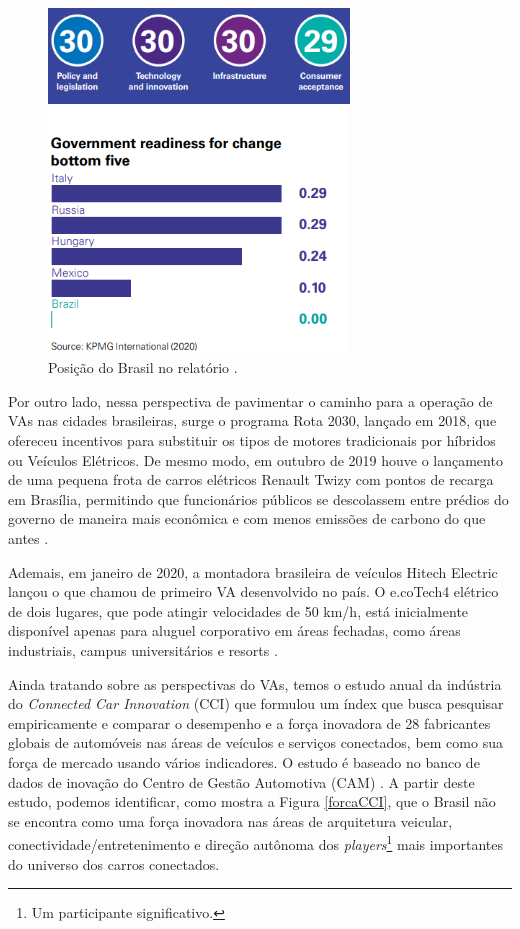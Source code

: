 \begin{figure}[H]
\centering
\includegraphics[width=8cm]{Figures/rank30.png}
\caption{Posição do Brasil no relatório \cite{KPMG}.}
\label{rank30}
\end{figure}

Por outro lado, nessa perspectiva de pavimentar o caminho para a operação de VAs nas cidades brasileiras, surge o programa Rota 2030, lançado em 2018, que ofereceu incentivos para substituir os tipos de motores tradicionais por híbridos ou Veículos Elétricos. De mesmo modo, em outubro de 2019 houve o lançamento de uma pequena frota de carros elétricos Renault Twizy com pontos de recarga em Brasília, permitindo que funcionários públicos se descolassem entre prédios do governo de maneira mais econômica e com menos emissões de carbono do que antes \cite{KPMG}.

Ademais, em janeiro de 2020, a montadora brasileira de veículos Hitech Electric lançou o que chamou de primeiro VA desenvolvido no país. O e.coTech4 elétrico de dois lugares, que pode atingir velocidades de 50 km/h, está inicialmente disponível apenas para aluguel corporativo em áreas fechadas, como áreas industriais, campus universitários e resorts \cite{KPMG}.


Ainda tratando sobre as perspectivas do VAs, temos o estudo anual da indústria do \textit{Connected Car Innovation} (CCI) que formulou um índex que busca pesquisar empiricamente e comparar o desempenho e a força inovadora de 28 fabricantes globais de automóveis nas áreas de veículos e serviços conectados, bem como sua força de mercado usando vários indicadores. O estudo é baseado no banco de dados de inovação do Centro de Gestão Automotiva (CAM) \cite{CCI}. A partir deste estudo, podemos identificar, como mostra a Figura \ref{forcaCCI}, que o Brasil não se encontra como uma força inovadora nas áreas de arquitetura veicular, conectividade/entretenimento e direção autônoma dos \textit{players}\footnote{Um participante significativo.} mais importantes do universo dos carros conectados.


